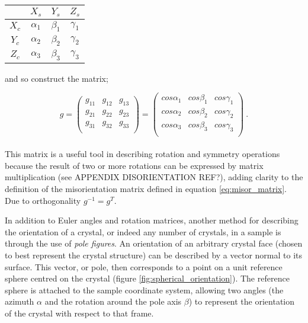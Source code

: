 \documentclass[a4paper,12pt]{report}
\numberwithin{equation}{chapter}
\begin{document}
\begin{table}[h!]
    \centering
	\begin{tabular}{c | c c c}

	  & $X_s$      & $Y_s$      & $Z_s$ \\
\hline
$X_c$ & $\alpha_1$ & $\beta_1$ & $\gamma_1$ \\
$Y_c$ & $\alpha_2$ & $\beta_2$ & $\gamma_2$ \\
$Z_c$ & $\alpha_3$ & $\beta_3$ & $\gamma_3$ \\

	\end{tabular}
\end{table}
\noindent
and so construct the matrix;

\begin{equation}
g = 
\begin{pmatrix}
g_{11} & g_{12} & g_{13} \\
g_{21} & g_{22} & g_{23} \\
g_{31} & g_{32} & g_{33} \\
\end{pmatrix}
= 
\begin{pmatrix}
cos \alpha_1 & cos \beta_1 & cos \gamma_1 \\
cos \alpha_2 & cos \beta_2 & cos \gamma_2 \\
cos \alpha_3 & cos \beta_3 & cos \gamma_3 \\
\end{pmatrix}\ .
\end{equation}
\\
This matrix is a useful tool in describing rotation and symmetry operations because the result of two or more rotations can be expressed by matrix multiplication (see APPENDIX DISORIENTATION REF?), adding clarity to the definition of the misorientation matrix defined in equation \ref{eq:misor_matrix}. Due to orthogonality $g^{-1} = g^T$. 


In addition to Euler angles and rotation matrices, another method for describing the orientation of a crystal, or indeed any number of crystals, in a sample is through the use of \emph{pole figures}. An orientation of an arbitrary crystal face (chosen to best represent the crystal structure) can be described by a vector normal to its surface. This vector, or pole, then corresponds to a point on a unit reference sphere centred on the crystal (figure \ref{fig:spherical_orientation}). The reference sphere is attached to the sample coordinate system, allowing two angles (the azimuth $\alpha$ and the rotation around the pole axis $\beta$) to represent the orientation of the crystal with respect to that frame.  
\end{document}
